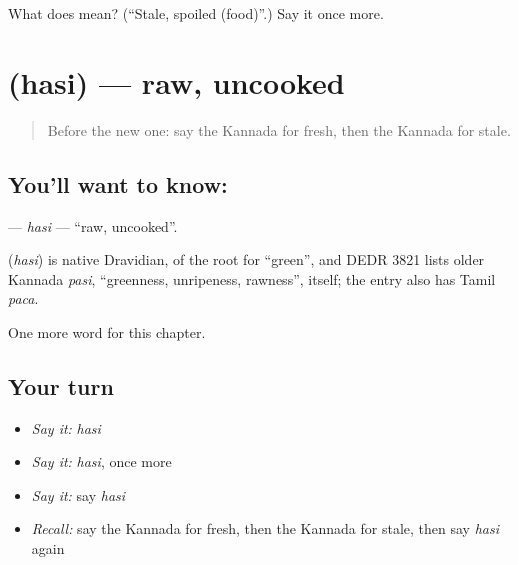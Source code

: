 \begin{tcolorbox}[breakable,colback=teal!4,colframe=teal!35!black,title={Before you move on}]
What does  mean? (\textquotedblleft{}Stale, spoiled (food)\textquotedblright{}.) Say it once more.
\end{tcolorbox}
\section[\texorpdfstring{\kn{ಹಸಿ} (hasi)}{ಹಸಿ (hasi)}]{ (hasi) — raw, uncooked}

\label{lesson:KA-C179-hasi}



\begin{quote}
Before the new one: say the Kannada for fresh, then the Kannada for stale.
\end{quote}

\subsection*{You'll want to know: }
\textbf{} — \emph{hasi} — \textquotedblleft{}raw, uncooked\textquotedblright{}.

\begin{cousinweb}
\textbf{} (\emph{hasi}) is native Dravidian, of the root for \textquotedblleft{}green\textquotedblright{}, and DEDR 3821 lists older Kannada \emph{pasi}, \textquotedblleft{}greenness, unripeness, rawness\textquotedblright{}, itself; the entry also has Tamil \emph{paca}.
\end{cousinweb}

\begin{grammarlens}[title={What you've built}]
One more word for this chapter.
\end{grammarlens}

\subsection*{Your turn}
\begin{itemize}
\raggedright
  \item \emph{Say it:} \emph{hasi}
  \item \emph{Say it:} \emph{hasi}, once more
  \item \emph{Say it:} say \emph{hasi}
  \item \emph{Recall:} say the Kannada for fresh, then the Kannada for stale, then say \emph{hasi} again
\end{itemize}

